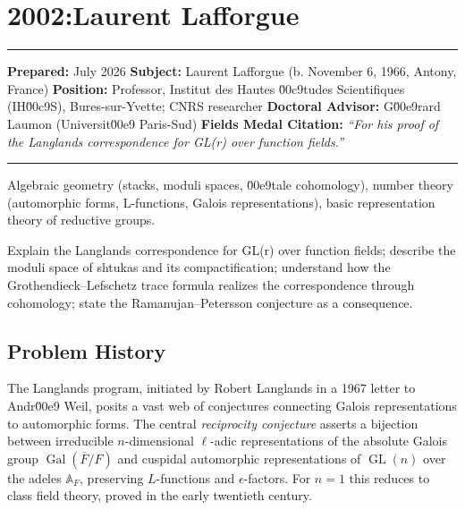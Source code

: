 \chapter{2002:Laurent Lafforgue}\label{ch2002laurentlafforgue:laurent-lafforgue-fields-medal-2002-a-comprehensive-report-on-his-work-and-impact}

\begin{center}\rule{0.5\linewidth}{0.5pt}\end{center}

\textbf{Prepared:} July 2026 \textbf{Subject:} Laurent Lafforgue (b. November 6, 1966, Antony, France) \textbf{Position:} Professor, Institut des Hautes \u00c9tudes Scientifiques (IH\u00c9S), Bures-sur-Yvette; CNRS researcher \textbf{Doctoral Advisor:} G\u00e9rard Laumon (Universit\u00e9 Paris-Sud) \textbf{Fields Medal Citation:} \emph{``For his proof of the Langlands correspondence for GL(r) over function fields.''}

\begin{center}\rule{0.5\linewidth}{0.5pt}\end{center}

\begin{prereqs} Algebraic geometry (stacks, moduli spaces, \u00e9tale cohomology), number theory (automorphic forms, L-functions, Galois representations), basic representation theory of reductive groups. \end{prereqs}

\begin{objectives} Explain the Langlands correspondence for GL(r) over function fields; describe the moduli space of shtukas and its compactification; understand how the Grothendieck--Lefschetz trace formula realizes the correspondence through cohomology; state the Ramanujan--Petersson conjecture as a consequence. \end{objectives}

\section{Problem History}

The Langlands program, initiated by Robert Langlands in a 1967 letter to Andr\u00e9 Weil, posits a vast web of conjectures connecting Galois representations to automorphic forms. The central \emph{reciprocity conjecture} asserts a bijection between irreducible $n$-dimensional $\ell$-adic representations of the absolute Galois group $\operatorname{Gal}(\overline{F}/F)$ and cuspidal automorphic representations of $\operatorname{GL}(n)$ over the adeles $\mathbb{A}_F$, preserving $L$-functions and $\epsilon$-factors. For $n=1$ this reduces to class field theory, proved in the early twentieth century.

